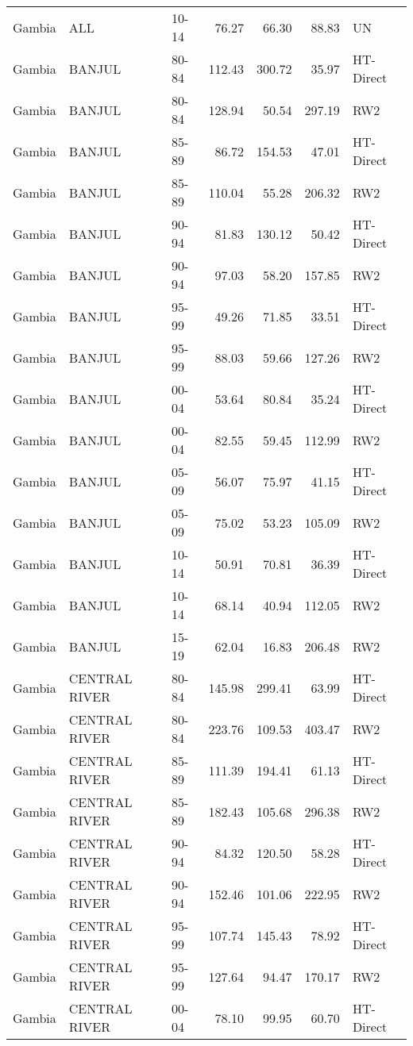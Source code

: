 \begin{longtable}{lllrrrl}
  Gambia & ALL & 10-14 & 76.27 & 66.30 & 88.83 & UN \\ 
  Gambia & BANJUL & 80-84 & 112.43 & 300.72 & 35.97 & HT-Direct \\ 
  Gambia & BANJUL & 80-84 & 128.94 & 50.54 & 297.19 & RW2 \\ 
  Gambia & BANJUL & 85-89 & 86.72 & 154.53 & 47.01 & HT-Direct \\ 
  Gambia & BANJUL & 85-89 & 110.04 & 55.28 & 206.32 & RW2 \\ 
  Gambia & BANJUL & 90-94 & 81.83 & 130.12 & 50.42 & HT-Direct \\ 
  Gambia & BANJUL & 90-94 & 97.03 & 58.20 & 157.85 & RW2 \\ 
  Gambia & BANJUL & 95-99 & 49.26 & 71.85 & 33.51 & HT-Direct \\ 
  Gambia & BANJUL & 95-99 & 88.03 & 59.66 & 127.26 & RW2 \\ 
  Gambia & BANJUL & 00-04 & 53.64 & 80.84 & 35.24 & HT-Direct \\ 
  Gambia & BANJUL & 00-04 & 82.55 & 59.45 & 112.99 & RW2 \\ 
  Gambia & BANJUL & 05-09 & 56.07 & 75.97 & 41.15 & HT-Direct \\ 
  Gambia & BANJUL & 05-09 & 75.02 & 53.23 & 105.09 & RW2 \\ 
  Gambia & BANJUL & 10-14 & 50.91 & 70.81 & 36.39 & HT-Direct \\ 
  Gambia & BANJUL & 10-14 & 68.14 & 40.94 & 112.05 & RW2 \\ 
  Gambia & BANJUL & 15-19 & 62.04 & 16.83 & 206.48 & RW2 \\ 
  Gambia & CENTRAL RIVER & 80-84 & 145.98 & 299.41 & 63.99 & HT-Direct \\ 
  Gambia & CENTRAL RIVER & 80-84 & 223.76 & 109.53 & 403.47 & RW2 \\ 
  Gambia & CENTRAL RIVER & 85-89 & 111.39 & 194.41 & 61.13 & HT-Direct \\ 
  Gambia & CENTRAL RIVER & 85-89 & 182.43 & 105.68 & 296.38 & RW2 \\ 
  Gambia & CENTRAL RIVER & 90-94 & 84.32 & 120.50 & 58.28 & HT-Direct \\ 
  Gambia & CENTRAL RIVER & 90-94 & 152.46 & 101.06 & 222.95 & RW2 \\ 
  Gambia & CENTRAL RIVER & 95-99 & 107.74 & 145.43 & 78.92 & HT-Direct \\ 
  Gambia & CENTRAL RIVER & 95-99 & 127.64 & 94.47 & 170.17 & RW2 \\ 
  Gambia & CENTRAL RIVER & 00-04 & 78.10 & 99.95 & 60.70 & HT-Direct \\ 

\end{longtable}
